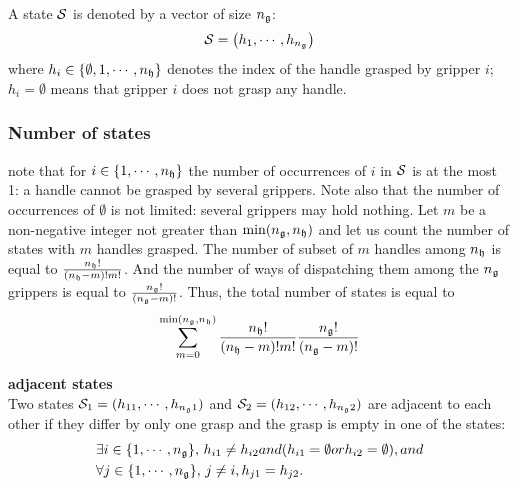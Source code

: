 A state $\mathcal{S}$ is denoted by a vector of size $n_{\mathfrak{g}}$:
\begin{equation}\label{eq:state}
\state = \left(h_1,\cdots,h_{\ngrippers}\right)
\end{equation}
where $h_i\in\{\emptyset,1,\cdots,n_{\mathfrak{h}}\}$ denotes the index of the handle grasped by gripper $i$; $h_i=\emptyset$ means that gripper $i$ does not grasp any handle.

\subsubsection{Number of states} note that for $i\in\{1,\cdots,n_{\mathfrak{h}}\}$ the number of occurrences of $i$ in $\mathcal{S}$ is at the most 1: a handle cannot be grasped by several grippers. Note also that the number of occurrences of $\emptyset$ is not limited: several grippers may hold nothing. Let $m$ be a non-negative integer not greater than $\min(n_{\mathfrak{g}},n_{\mathfrak{h}})$ and let us count the number of states with $m$ handles grasped. The number of subset of $m$ handles among $n_{\mathfrak{h}}$ is equal to $\frac{n_{\mathfrak{h}}!}{(n_{\mathfrak{h}}-m)!m!}$. And the number of ways of dispatching them among the $n_{\mathfrak{g}}$ grippers is equal to $\frac{n_{\mathfrak{g}}!}{(n_{\mathfrak{g}}-m)!}$. Thus, the total number of states is equal to
$$
\sum_{m=0}^{\min(n_{\mathfrak{g}},n_{\mathfrak{h}})} \frac{n_{\mathfrak{h}}!}{(n_{\mathfrak{h}}-m)!m!} \frac{n_{\mathfrak{g}}!}{(n_{\mathfrak{g}}-m)!}
$$
\begin{definition}\label{def:neighboring-states}\textbf{adjacent states}\\
  Two states $\mathcal{S}_1=(h_{1 1},\cdots,h_{n_{\mathfrak{g}} 1})$ and $\mathcal{S}_2=(h_{1 2},\cdots,h_{n_{\mathfrak{g}} 2})$ are adjacent to each other if they differ by only one grasp and the grasp is empty in one of the states:
  \begin{align*}
    &\exists i\in\{1,\cdots,n_{\mathfrak{g}}\},\,h_{i 1} \not= h_{i 2} \relax{ and } (h_{i 1}=\emptyset \relax{ or } h_{i 2}=\emptyset), \relax{ and }\\
    &\forall j\in\{1,\cdots,n_{\mathfrak{g}}\},\, j\not=i,h_{j 1} = h_{j 2}.
  \end{align*}
\end{definition}
